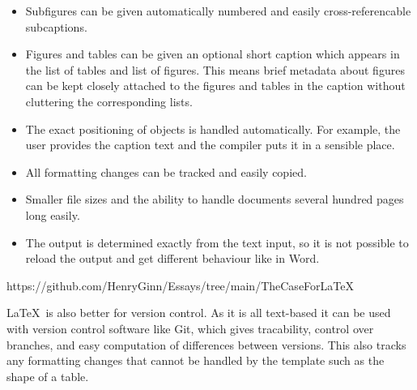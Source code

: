 \begin{itemize}
	\item Subfigures can be given automatically numbered and easily cross-referencable subcaptions.
	\item Figures and tables can be given an optional short caption which appears in the list of tables and list of figures. This means brief metadata about figures can be kept closely attached to the figures and tables in the caption without cluttering the corresponding lists.
	\item The exact positioning of objects is handled automatically. For example, the user provides the caption text and the compiler puts it in a sensible place.
	\item All formatting changes can be tracked and easily copied.
	\item Smaller file sizes and the ability to handle documents several hundred pages long easily.
	\item The output is determined exactly from the text input, so it is not possible to reload the output and get different behaviour like in Word.
\end{itemize}https://github.com/HenryGinn/Essays/tree/main/TheCaseForLaTeX

\LaTeX\ is also better for version control. As it is all text-based it can be used with version control software like Git, which gives tracability, control over branches, and easy computation of differences between versions. This also tracks any formatting changes that cannot be handled by the template such as the shape of a table.